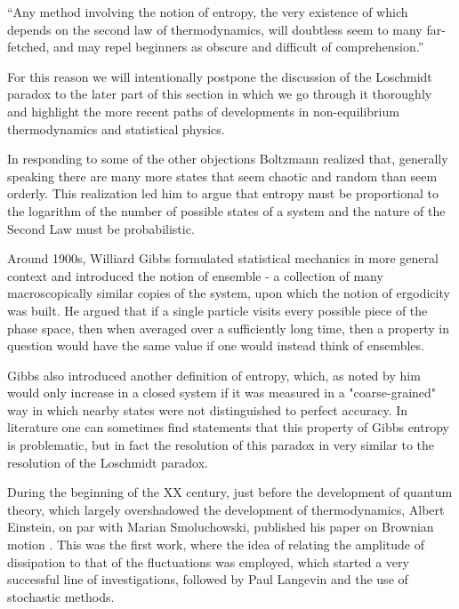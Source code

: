 \documentclass[a4paper,12pt]{article}
\begin{document}
\begin{displayquote}
“Any method involving the notion of entropy, the very existence of which depends on the second law of thermodynamics, will doubtless seem to many far-fetched, and may repel beginners as obscure and difficult of comprehension.”
\end{displayquote}

For this reason we will intentionally postpone the discussion of the Loschmidt paradox to the later part of this section in which we go through it thoroughly and highlight the more recent paths of developments in non-equilibrium thermodynamics and statistical physics.

In responding to some of the other objections Boltzmann realized that, generally speaking there are many more states that seem chaotic and random than seem orderly. This realization led him to argue that entropy must be proportional to the logarithm of the number of possible states of a system and the nature of the Second Law must be probabilistic.

Around 1900s, Williard Gibbs formulated statistical mechanics in more general context and introduced the notion of ensemble - a collection of many macroscopically similar copies of the system, upon which the notion of ergodicity was built. 
He argued that if a single particle visits every possible piece of the phase space, then when averaged over a sufficiently long time, then a property in question would have the same value if one would instead think of ensembles. 

Gibbs also introduced another definition of entropy, which, as noted by him \cite{Gibbs:1928tw} would only increase in a closed system if it was measured in a "coarse-grained" way in which nearby states were not distinguished to perfect accuracy. In literature one can sometimes find statements \cite{Evans:2241458} that this property of Gibbs entropy is problematic, but in fact the resolution of this paradox in very similar to the resolution of the Loschmidt paradox.

During the beginning of the XX century, just before 
the development of quantum theory, which largely overshadowed the development of thermodynamics, Albert Einstein, on par with Marian Smoluchowski, published his paper on Brownian motion \cite{Einstein:eEYNf903}. This was the first work, where the idea of relating the amplitude of dissipation to that of the fluctuations was employed, which started a very successful line of investigations, followed by Paul Langevin and the use of stochastic methods.
\end{document}

